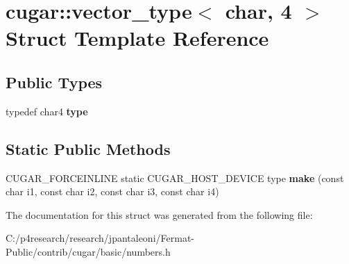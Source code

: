 \hypertarget{structcugar_1_1vector__type_3_01char_00_014_01_4}{}\section{cugar\+:\+:vector\+\_\+type$<$ char, 4 $>$ Struct Template Reference}
\label{structcugar_1_1vector__type_3_01char_00_014_01_4}
\subsection*{Public Types}
\begin{DoxyCompactItemize}
\item 
\mbox{\label{structcugar_1_1vector__type_3_01char_00_014_01_4_ad0700a86a9c76ce80446b47a0bb62513}} 
typedef char4 {\bfseries type}
\end{DoxyCompactItemize}
\subsection*{Static Public Methods}
\begin{DoxyCompactItemize}
\item 
\mbox{\label{structcugar_1_1vector__type_3_01char_00_014_01_4_aa70e6c4bd430a90a74cf1e4991ea553f}} 
C\+U\+G\+A\+R\+\_\+\+F\+O\+R\+C\+E\+I\+N\+L\+I\+NE static C\+U\+G\+A\+R\+\_\+\+H\+O\+S\+T\+\_\+\+D\+E\+V\+I\+CE type {\bfseries make} (const char i1, const char i2, const char i3, const char i4)
\end{DoxyCompactItemize}


The documentation for this struct was generated from the following file\+:\begin{DoxyCompactItemize}
\item 
C\+:/p4research/research/jpantaleoni/\+Fermat-\/\+Public/contrib/cugar/basic/numbers.\+h\end{DoxyCompactItemize}
